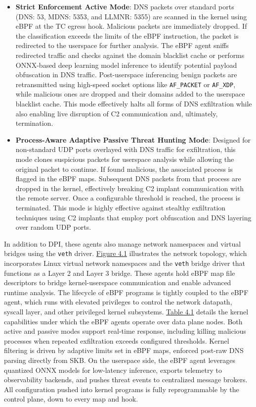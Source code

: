 \documentclass [11pt, proquest] {uwthesis}[2020/02/24]
\begin{document}
\begin{itemize}[itemsep=1pt,parsep=0pt]
    \item \textbf{Strict Enforcement Active Mode}: DNS packets over standard ports (DNS: 53, MDNS: 5353, and LLMNR: 5355) are scanned in the kernel using eBPF at the TC egress hook. Malicious packets are immediately dropped. If the classification exceeds the limits of the eBPF instruction, the packet is redirected to the userspace for further analysis. The eBPF agent sniffs redirected traffic and checks against the domain blacklist cache or performs ONNX-based deep learning model inference to identify potential payload obfuscation in DNS traffic. Post-userspace inferencing benign packets are retransmitted using high-speed socket options like \texttt{AF\_PACKET} or \texttt{AF\_XDP}, while malicious ones are dropped and their domains added to the userspace blacklist cache. This mode effectively halts all forms of DNS exfiltration while also enabling live disruption of C2 communication and, ultimately, termination.
    
    \item \textbf{Process-Aware Adaptive Passive Threat Hunting Mode}: Designed for non-standard UDP ports overlayed with DNS traffic for exfiltration, this mode clones suspicious packets for userspace analysis while allowing the original packet to continue. If found malicious, the associated process is flagged in the eBPF maps. Subsequent DNS packets from that process are dropped in the kernel, effectively breaking C2 implant communication with the remote server. Once a configurable threshold is reached, the process is terminated. This mode is highly effective against stealthy exfiltration techniques using C2 implants that employ port obfuscation and DNS layering over random UDP ports. 
\end{itemize}

In addition to DPI, these agents also manage network namespaces and virtual bridges using the \texttt{veth} driver. \hyperref[sec:dp_eBPF_agent_net_topology]{Figure 4.1} illustrates the network topology, which incorporates Linux virtual network namespaces and the \texttt{veth} bridge driver that functions as a Layer 2 and Layer 3 bridge.
These agents hold eBPF map file descriptors to bridge kernel-userspace communication and enable advanced runtime analysis. The lifecycle of eBPF programs is tightly coupled to the eBPF agent, which runs with elevated privileges to control the network datapath, syscall layer, and other privileged kernel subsystems. \hyperref[sec:dp_kernel_cap]{Table 4.1} details the kernel capabilities under which the eBPF agents operate over data plane nodes. Both active and passive modes support real-time response, including killing malicious processes when repeated exfiltration exceeds configured thresholds. Kernel filtering is driven by adaptive limits set in eBPF maps, enforced post-raw DNS parsing directly from SKB. On the userspace side, the eBPF agent leverages quantized ONNX models for low-latency inference, exports telemetry to observability backends, and pushes threat events to centralized message brokers. All configuration pushed into kernel programs is fully reprogrammable by the control plane, down to every map and hook.
\end{document}
